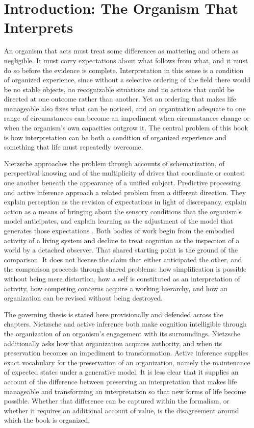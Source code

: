 \chapter*{Introduction: The Organism That Interprets}

An organism that acts must treat some differences as mattering and others as negligible. It must carry expectations about what follows from what, and it must do so before the evidence is complete. Interpretation in this sense is a condition of organized experience, since without a selective ordering of the field there would be no stable objects, no recognizable situations and no actions that could be directed at one outcome rather than another. Yet an ordering that makes life manageable also fixes what can be noticed, and an organization adequate to one range of circumstances can become an impediment when circumstances change or when the organism's own capacities outgrow it. The central problem of this book is how interpretation can be both a condition of organized experience and something that life must repeatedly overcome.

Nietzsche approaches the problem through accounts of schematization, of perspectival knowing and of the multiplicity of drives that coordinate or contest one another beneath the appearance of a unified subject. Predictive processing and active inference approach a related problem from a different direction. They explain perception as the revision of expectations in light of discrepancy, explain action as a means of bringing about the sensory conditions that the organism's model anticipates, and explain learning as the adjustment of the model that generates those expectations \citep{rao1999,friston2010,clark2016,parr2022}. Both bodies of work begin from the embodied activity of a living system and decline to treat cognition as the inspection of a world by a detached observer. That shared starting point is the ground of the comparison. It does not license the claim that either anticipated the other, and the comparison proceeds through shared problems: how simplification is possible without being mere distortion, how a self is constituted as an interpretation of activity, how competing concerns acquire a working hierarchy, and how an organization can be revised without being destroyed.

The governing thesis is stated here provisionally and defended across the chapters. Nietzsche and active inference both make cognition intelligible through the organization of an organism's engagement with its surroundings. Nietzsche additionally asks how that organization acquires authority, and when its preservation becomes an impediment to transformation. Active inference supplies exact vocabulary for the preservation of an organization, namely the maintenance of expected states under a generative model. It is less clear that it supplies an account of the difference between preserving an interpretation that makes life manageable and transforming an interpretation so that new forms of life become possible. Whether that difference can be captured within the formalism, or whether it requires an additional account of value, is the disagreement around which the book is organized.


